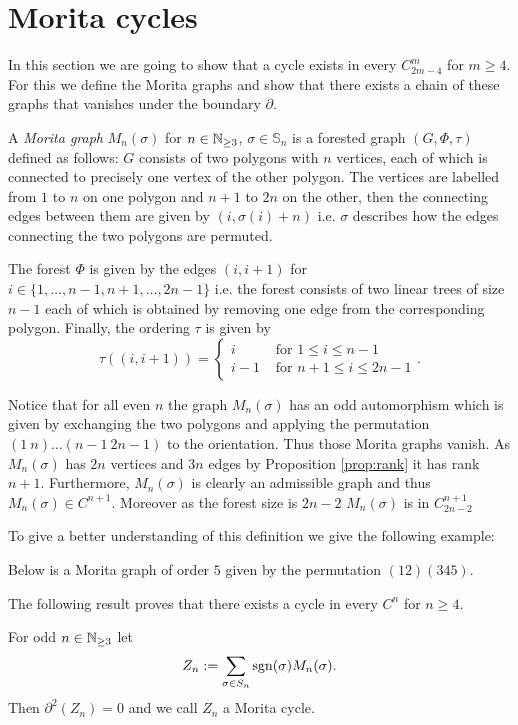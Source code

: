 \section{Morita cycles}\label{sec:MoritaClasses}
In this section we are going to show that a cycle exists in every $C^{m}_{2m-4}$ for $m \geq 4$.
For this we define the Morita graphs and show that there exists a chain of these graphs that vanishes under the boundary $\partial$.

\begin{definition}
	A \emph{Morita graph} $M_{n}(\sigma)$ for $n \in \mathbb{N}_{\geq 3}$, $\sigma \in \mathbb{S}_{n}$ is a forested graph $(G,\Phi,\tau)$ defined as follows:
	$G$ consists of two polygons with $n$ vertices, each of which is connected to precisely one vertex of the other polygon.
	The vertices are labelled from $1$ to $n$ on one polygon and $n+1$ to $2n$ on the other, then the connecting edges between them are given by $(i,\sigma(i)+n)$ i.e.
	$\sigma$ describes how the edges connecting the two polygons are permuted.

	The forest $\Phi$ is given by the edges $(i,i+1)$ for $i \in \{1,\ldots,n-1, n+1,\ldots,2n-1\}$ i.e. the
	forest consists of two linear trees of size $n-1$ each of which is obtained by removing one edge from the corresponding polygon.
	Finally, the ordering $\tau$ is given by
	\[
		\tau((i,i+1)) = \begin{cases}
			i & \text{ for } 1 \leq i \leq n-1\\ 
			i-1 & \text{ for } n+1 \leq i \leq 2n-1
		\end{cases}
	.\] 
\end{definition}
Notice that for all even $n$ the graph $M_{n}(\sigma)$ has an odd automorphism which is given by exchanging the two polygons and applying the permutation $(1\ n) \ldots (n-1\ 2n -1)$
to the orientation.
Thus those Morita graphs vanish.
As $M_{n}(\sigma)$ has $2n$ vertices and $3n$ edges by Proposition \ref{prop:rank} it has rank $n+1$.
Furthermore, $M_{n}(\sigma)$ is clearly an admissible graph and thus $M_{n}(\sigma) \in C^{n+1}$. Moreover as the forest size is $2n-2$ $M_{n}(\sigma)$ is in $C^{n+1}_{2n -2}$

To give a better understanding of this definition we give the following example:
\begin{eg}
	Below is a Morita graph of order $5$ given by the permutation $(12)(345)$.
\end{eg}

The following result proves that there exists a cycle in every $C^{n}$ for $n \geq 4$.
\begin{theorem}
	For odd $n \in \mathbb{N}_{\geq 3}$ let 
	\[
		Z_{n} := \sum_{\sigma \in S_{n}} \operatorname{sgn}(\sigma) M_{n}(\sigma)
	.\] 
	Then $\partial^2(Z_{n}) = 0$ and we call $Z_{n}$ a Morita cycle.
\end{theorem}

